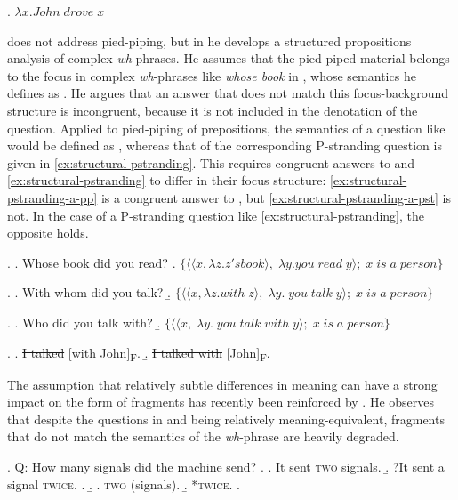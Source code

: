 \ex. $\lambda x. John\;drove\;x$

\newpage
\noindent \citet{reich2002a} does not address pied-piping, but in \citet{reich2002} he develops a structured propositions analysis of complex \textit{wh}-phrases. He assumes that the pied-piped material belongs to the focus in complex \textit{wh}-phrases like \textit{whose book} in \Next[a], whose semantics he defines as \Next[b]. He argues that an answer that does not match this focus-background structure is incongruent, because it is not included in the denotation of the question. Applied to pied-piping of prepositions, the semantics of a question like \NNext[a] would be defined as \NNext[b], whereas that of the corresponding P-stranding question is given in \ref{ex:structural-pstranding}. This requires congruent answers to \NNext and \ref{ex:structural-pstranding} to differ in their focus structure: \ref{ex:structural-pstranding-a-pp} is a congruent answer to \NNext, but \ref{ex:structural-pstranding-a-pst} is not. In the case of a P-stranding question like \ref{ex:structural-pstranding}, the opposite holds.

\ex. \a. Whose book did you read?\hfill\citep{reich2002}
    \b. $\{\langle\langle x, \lambda z . z's book \rangle ,\;\lambda y . you\;read\;y \rangle;\; x \; is \; a \; person\}$
    
\ex. \a. With whom did you talk?
    \b. $\{\langle\langle x, \lambda z . with\; z \rangle ,\;\lambda y.\; you\;talk\;y \rangle;\; x \; is \; a \; person\}$

\ex. \label{ex:structural-pstranding}
\a. Who did you talk with?
    \b. $\{\langle\langle x,\;\lambda y.\; you\;talk\;with\;y \rangle;\; x \; is \; a \; person\}$

\ex. \a. \sout{I talked} [with John]\textsubscript{\textsc{F}}.\label{ex:structural-pstranding-a-pp}
     \b.  \sout{I talked with} [John]\textsubscript{\textsc{F}}.\label{ex:structural-pstranding-a-pst}

The assumption that relatively subtle differences in meaning can have a strong impact on the form of fragments has recently been reinforced by \citet{weir2018}. He observes that despite the questions in \Next and \NNext being relatively meaning-equivalent, fragments that do not match the semantics of the \textit{wh}-phrase are heavily degraded.

\ex. \label{ex:weir-qa-ex1}
 Q: How many signals did the machine send? \hfill \citep[1289]{weir2018}
\a.  \a. It sent \textsc{two} signals.
\b. ?It sent a signal \textsc{twice}.
\z.
\b. \a. \textsc{two} (signals).
\b. *\textsc{twice}.
\z.

